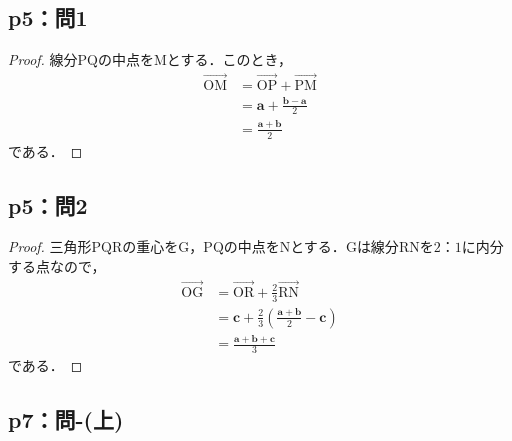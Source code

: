 \documentclass[uplatex,dvipdfmx,a4paper,11pt,fleqn]{jsarticle}
\begin{document}
\subsection*{p5：問1}

\begin{tleftbar}
    \begin{proof}
		線分$\mathrm{PQ}$の中点を$\mathrm{M}$とする．このとき，
		\begin{align*}
		\overrightarrow{\mathrm{OM}} & = \overrightarrow{\mathrm{OP}} + \overrightarrow{\mathrm{PM}} \\
		& = \bm{a} + \frac{\bm{b}-\bm{a}}{2} \\
		& = \frac{\bm{a}+\bm{b}}{2}
		\end{align*}
		である．
	\end{proof}
\end{tleftbar}
\subsection*{p5：問2}
\begin{tleftbar}
	\begin{proof}
		三角形$\mathrm{PQR}$の重心を$\mathrm{G}$，$\mathrm{PQ}$の中点を$\mathrm{N}$とする．$\mathrm{G}$は線分$\mathrm{RN}$を$2：1$に内分する点なので，
		\begin{align*}
			\overrightarrow{\mathrm{OG}} &= \overrightarrow{\mathrm{OR}} + \frac{2}{3} \overrightarrow{\mathrm{RN}} \\
			& = \bm{c}+ \frac{2}{3} \left (\frac{\bm{a}+\bm{b}}{2}-\bm{c} \right) \\
			& = \frac{\bm{a}+\bm{b}+\bm{c}}{3}
		\end{align*}
		である．
	\end{proof}
\end{tleftbar}

\newpage

\subsection*{p7：問-(上)}
\end{document}
